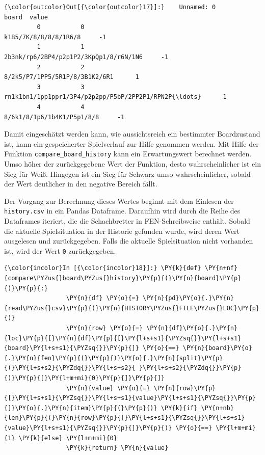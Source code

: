 \begin{Verbatim}[commandchars=\\\{\}]
{\color{outcolor}Out[{\color{outcolor}17}]:}    Unnamed: 0                                              board  value
         0           0                              k1B5/7K/8/8/8/8/1R6/8     -1
         1           1             2b3nk/rp6/2BP4/p2p1P2/3KpQp1/8/r6N/1N6     -1
         2           2                     8/2k5/P7/1PP5/5R1P/8/3B1K2/6R1      1
         3           3  rn1k1bn1/1pp1ppr1/3P4/p2p2pp/P5bP/2PP2P1/RPN2P{\ldots}      1
         4           4                         8/6k1/8/1p6/1b4K1/P5p1/8/8     -1
\end{Verbatim}
            
    Damit eingeschätzt werden kann, wie aussichtsreich ein bestimmter
Boardzustand ist, kann ein gespeicherter Spielverlauf zur Hilfe genommen
werden. Mit Hilfe der Funktion \texttt{compare\_board\_history} kann ein
Erwartungswert berechnet werden. Umso höher der zurückgegebene Wert der
Funktion, desto wahrscheinlicher ist ein Sieg für Weiß. Hingegen ist ein
Sieg für Schwarz umso wahrscheinlicher, sobald der Wert deutlicher in
den negative Bereich fällt.

Der Vorgang zur Berechnung dieses Wertes beginnt mit dem Einlesen der
\texttt{history.csv} in ein Pandas Dataframe. Daraufhin wird durch die
Reihe des Dataframes iteriert, die die Schachbretter in FEN-Schreibweise
enthält. Sobald die aktuelle Spielsituation in der Historie gefunden
wurde, wird deren Wert ausgelesen und zurückgegeben. Falls die aktuelle
Spielsituation nicht vorhanden ist, wird der Wert \texttt{0}
zurückgegeben.

    \begin{Verbatim}[commandchars=\\\{\}]
{\color{incolor}In [{\color{incolor}18}]:} \PY{k}{def} \PY{n+nf}{compare\PYZus{}board\PYZus{}history}\PY{p}{(}\PY{n}{board}\PY{p}{)}\PY{p}{:}
                 \PY{n}{df} \PY{o}{=} \PY{n}{pd}\PY{o}{.}\PY{n}{read\PYZus{}csv}\PY{p}{(}\PY{n}{HISTORY\PYZus{}FILE\PYZus{}LOC}\PY{p}{)}
                 \PY{n}{row} \PY{o}{=} \PY{n}{df}\PY{o}{.}\PY{n}{loc}\PY{p}{[}\PY{n}{df}\PY{p}{[}\PY{l+s+s1}{\PYZsq{}}\PY{l+s+s1}{board}\PY{l+s+s1}{\PYZsq{}}\PY{p}{]} \PY{o}{==} \PY{n}{board}\PY{o}{.}\PY{n}{fen}\PY{p}{(}\PY{p}{)}\PY{o}{.}\PY{n}{split}\PY{p}{(}\PY{l+s+s2}{\PYZdq{}}\PY{l+s+s2}{ }\PY{l+s+s2}{\PYZdq{}}\PY{p}{)}\PY{p}{[}\PY{l+m+mi}{0}\PY{p}{]}\PY{p}{]}
                 \PY{n}{value} \PY{o}{=} \PY{n}{row}\PY{p}{[}\PY{l+s+s1}{\PYZsq{}}\PY{l+s+s1}{value}\PY{l+s+s1}{\PYZsq{}}\PY{p}{]}\PY{o}{.}\PY{n}{item}\PY{p}{(}\PY{p}{)} \PY{k}{if} \PY{n+nb}{len}\PY{p}{(}\PY{n}{row}\PY{p}{[}\PY{l+s+s1}{\PYZsq{}}\PY{l+s+s1}{value}\PY{l+s+s1}{\PYZsq{}}\PY{p}{]}\PY{p}{)} \PY{o}{==} \PY{l+m+mi}{1} \PY{k}{else} \PY{l+m+mi}{0}
                 \PY{k}{return} \PY{n}{value}
\end{Verbatim}


